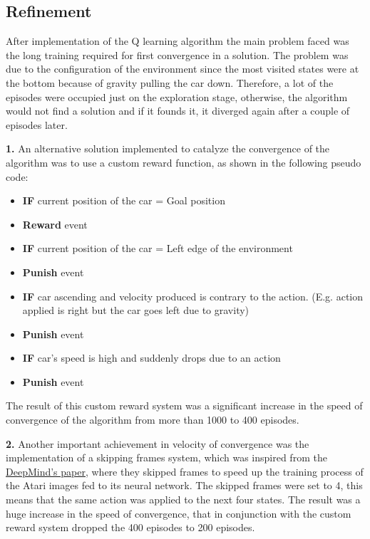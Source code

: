 \subsection{Refinement}
\label{sub:Refinement}

After implementation of the Q learning algorithm the main problem faced was the long training required for first convergence in a solution. The problem was due to the configuration of the environment since the most visited states were at the bottom because of gravity pulling the car down. Therefore, a lot of the episodes were occupied just on the exploration stage, otherwise, the algorithm would not find a solution and if it founds it, it diverged again after a couple of episodes later. 

\vspace{0.5cm}

\textbf{1.} An alternative solution implemented to catalyze the convergence of the algorithm was to use a custom reward function, as shown in the following pseudo code:

\begin{itemize}
\item[] \textbf{IF} current position of the car = Goal position
\item[] \quad \textbf{Reward} event
\item[] \textbf{IF} current position of the car = Left edge of the environment
\item[] \quad \textbf{Punish} event
\item[] \textbf{IF} car ascending and velocity produced is contrary to the action. (E.g. action applied is right but the car goes left due to gravity)
\item[] \quad \textbf{Punish} event
\item[] \textbf{IF} car's speed is high and suddenly drops due to an action
\item[] \quad \textbf{Punish} event
\end{itemize}

The result of this custom reward system was a significant increase in the speed of convergence of the algorithm from more than 1000 to 400 episodes.
\linebreak

\textbf{2.} Another important achievement in velocity of convergence was the implementation of a skipping frames system, which was inspired from the \href{https://storage.googleapis.com/deepmind-media/dqn/DQNNaturePaper.pdf}{DeepMind's paper}, where they skipped frames to speed up the training process of the Atari images fed to its neural network. The skipped frames were set to 4, this means that the same action was applied to the next four states. The result was a huge 
increase in the speed of convergence, that in conjunction with the custom reward system dropped the 400 episodes to 200 episodes.